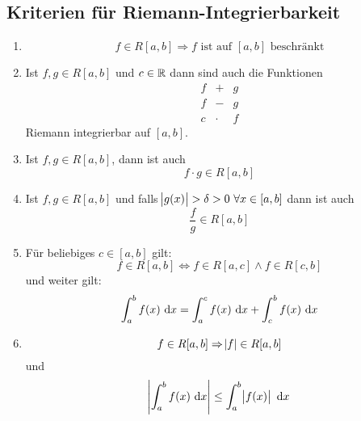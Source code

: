 \subsection{Kriterien für Riemann-Integrierbarkeit}
\begin{enumerate}[label= (\alph*)]
    \item
        \begin{equation*}
            f \in R[a, b] \Rightarrow f \text{ ist auf } [a,b] \text{ beschränkt}
        \end{equation*}
    \item Ist $f, g \in R [a, b]$ und $c \in \mathbb{R}$ dann sind auch die Funktionen
        \begin{eqnarray*}
            f&+&g\\
            f&-&g\\
            c &\cdot& f
        \end{eqnarray*}
        Riemann integrierbar auf $[a, b]$.
    \item Ist $f, g \in R[a, b]$, dann ist auch
        \begin{equation*}
            f \cdot g \in R[a, b]
        \end{equation*}
    \item Ist $f, g \in R[a, b]$ und falls
        $\abs{g(x)} > \delta > 0\ \forall x \in [a, b]$ dann ist auch
        \begin{equation*}
            \frac{f}{g} \in R[a, b]
        \end{equation*}
    \item Für beliebiges $c \in [a, b]$  gilt:
        \begin{equation*}
            f \in R[a, b] \Leftrightarrow f \in R[a, c] \land f \in R[c, b]
        \end{equation*}
        und weiter gilt:
        \begin{equation*}
            \int_a^b f(x) \text{ d}x = \int_a^c f(x) \text{ d}x + \int_c^b f(x) \text{ d}x
        \end{equation*}
    \item
        \begin{equation*}
        f \in R[a, b] \Rightarrow \abs{f} \in R[a, b]
        \end{equation*}
        und
        \begin{equation*}
            \abs{\int_a^b f(x)\text{ d}x} \leq \int_a^b \abs{f(x)} \text{ d}x
        \end{equation*}
\end{enumerate}

